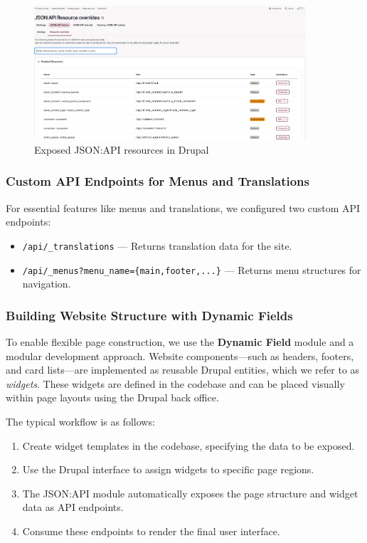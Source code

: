 \begin{figure}[H]
    \centering
    \includegraphics[width=0.9\textwidth]{images/json-api-recources.png}
    \caption{Exposed JSON:API resources in Drupal}
    \label{fig:jsonapi_resources}
\end{figure}

\subsubsection{Custom API Endpoints for Menus and Translations}
For essential features like menus and translations, we configured two custom API endpoints:
\begin{itemize}
    \item \texttt{/api/\_translations} — Returns translation data for the site.
    \item \texttt{/api/\_menus?menu\_name=\{main,footer,...\}} — Returns menu structures for navigation.
\end{itemize}

\subsubsection{Building Website Structure with Dynamic Fields}
To enable flexible page construction, we use the \textbf{Dynamic Field} module and a modular development approach. Website components—such as headers, footers, and card lists—are implemented as reusable Drupal entities, which we refer to as \textit{widgets}. These widgets are defined in the codebase and can be placed visually within page layouts using the Drupal back office.

The typical workflow is as follows:
\begin{enumerate}
    \item Create widget templates in the codebase, specifying the data to be exposed.
    \item Use the Drupal interface to assign widgets to specific page regions.
    \item The JSON:API module automatically exposes the page structure and widget data as API endpoints.
    \item Consume these endpoints to render the final user interface.
\end{enumerate}


